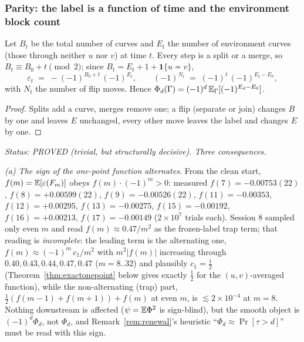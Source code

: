 \subsubsection{Parity: the label is a function of time and the
environment block count}\label{sec:parity}

\begin{lemma}\label{lem:parity}
Let $B_t$ be the total number of curves and $E_t$ the number of
environment curves (those through neither $u$ nor $v$) at time $t$.
Every step is a split or a merge, so $B_t\equiv B_0+t\pmod 2$; since
$B_t=E_t+1+\mathbf 1\{u\not\sim v\}$,
\[
\varepsilon_t\;=\;-(-1)^{B_0+t}\,(-1)^{E_t},
\qquad
(-1)^{N_t}\;=\;(-1)^{t}\,(-1)^{E_t-E_0},
\]
with $N_t$ the number of flip moves.  Hence
$\Phi_d(\Gamma)=(-1)^d\,\mathbb{E}_\Gamma[(-1)^{E_d-E_0}]$.
\end{lemma}

\begin{proof}
Splits add a curve, merges remove one; a flip (separate or join)
changes $B$ by one and leaves $E$ unchanged, every other move leaves
the label and changes $E$ by one.
\end{proof}

\emph{Status: PROVED (trivial, but structurally decisive).  Three
consequences.}

\emph{(a) The sign of the one-point function alternates.}  From the
clean start, $f(m)=\mathbb{E}[\varepsilon(F_m)]$ obeys
$f(m)\cdot(-1)^m>0$: measured $f(7)=-0.00753(22)$, $f(8)=+0.00599(22)$,
$f(9)=-0.00526(22)$, $f(11)=-0.00353$, $f(12)=+0.00295$,
$f(13)=-0.00275$, $f(15)=-0.00192$, $f(16)=+0.00213$,
$f(17)=-0.00149$ ($2\times10^7$ trials each).  Session 8 sampled only
even $m$ and read $f(m)\approx0.47/m^2$ as the frozen-label trap
term; that reading is \emph{incomplete}: the leading term is the
alternating one, $f(m)\approx(-1)^m\,c_1/m^2$ with $m^2|f(m)|$
increasing through $0.40,0.43,0.44,0.47,0.47$ ($m=8..32$) and
plausibly $c_1=\tfrac12$ (Theorem~\ref{thm:exactonepoint} below gives
exactly $\tfrac12$ for the $(u,v)$-averaged function), while the
non-alternating (trap) part, $\tfrac12(f(m{-}1)+f(m{+}1))+f(m)$ at
even $m$, is $\lesssim2\times10^{-4}$ at $m=8$.  Nothing downstream
is affected ($\psi=\mathbb{E}\Phi^2$ is sign-blind), but the smooth object is
$(-1)^d\Phi_d$, not $\Phi_d$, and Remark~\ref{rem:renewal}'s heuristic
``$\Phi_d\approx\Pr[\tau>d]$'' must be read with this sign.


